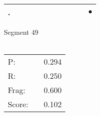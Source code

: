 \documentclass[landscape]{article}
\newcommand{\ssp}{\hspace{2pt}}
\newcommand{\mex}{\cellcolor{g}$\bullet$}
\begin{document}
\begin{tabular}{|l|p{10pt}|p{10pt}|p{10pt}|p{10pt}|p{10pt}|p{10pt}|p{10pt}|p{10pt}|p{10pt}|p{10pt}|}
\hline
\ssp \cellcolor{ref9}. \ssp&\hspace{2pt}&\hspace{2pt}&\hspace{2pt}&\hspace{2pt}&\hspace{2pt}&\hspace{2pt}&\hspace{2pt}&\hspace{2pt}&\hspace{2pt}&\hspace{2pt}\mex\\
\hline
\end{tabular}

\vspace{6pt}
\noindent Segment 49\\\\
\noindent\begin{tabular}{lm{12pt}r}
\hline
P:&&0.294\\
R:&&0.250\\
Frag:&&0.600\\
Score:&&0.102\\
\end{tabular}

\newpage
\end{document}
